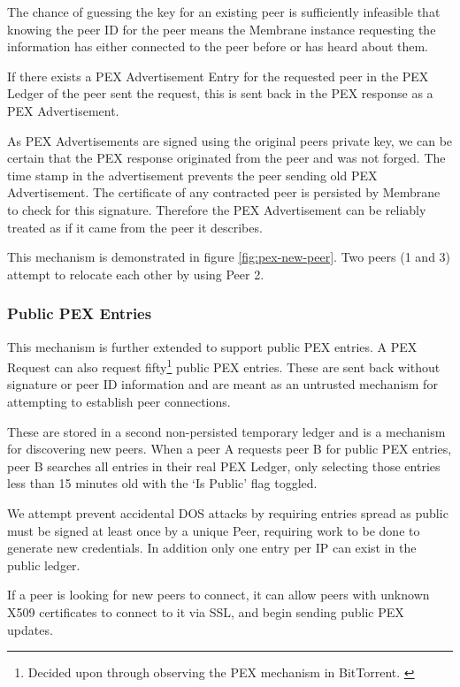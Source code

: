 \documentclass[11pt, a4paper, twoside]{report}
\begin{document}
The chance of guessing the key for an existing peer is sufficiently infeasible that knowing the peer ID for the peer means the Membrane instance requesting the information has either connected to the peer before or has heard about them.

If there exists a PEX Advertisement Entry for the requested peer in the PEX Ledger of the peer sent the request, this is sent back in the PEX response as a PEX Advertisement.

As PEX Advertisements are signed using the original peers private key, we can be certain that the PEX response originated from the peer and was not forged. \citep{li1993remark} The time stamp in the advertisement prevents the peer sending old PEX Advertisement. The certificate of any contracted peer is persisted by Membrane to check for this signature. Therefore the PEX Advertisement can be reliably treated as if it came from the peer it describes.

This mechanism is demonstrated in figure \ref{fig:pex-new-peer}. Two peers (1 and 3) attempt to relocate each other by using Peer 2.

\subsubsection{Public PEX Entries}

This mechanism is further extended to support public PEX entries. A PEX Request can also request fifty\footnote{Decided upon through observing the PEX mechanism in BitTorrent. \citep{vuze2010vuze}} public PEX entries. These are sent back without signature or peer ID information and are meant as an untrusted mechanism for attempting to establish peer connections.

These are stored in a second non-persisted temporary ledger and is a mechanism for discovering new peers. When a peer A requests peer B for public PEX entries, peer B searches all entries in their real PEX Ledger, only selecting those entries less than 15 minutes old with the `Is Public' flag toggled.

We attempt prevent accidental DOS attacks by requiring entries spread as public must be signed at least once by a unique Peer, requiring work to be done to generate new credentials. In addition only one entry per IP can exist in the public ledger.

If a peer is looking for new peers to connect, it can allow peers with unknown X509 certificates to connect to it via SSL, and begin sending public PEX updates.
\end{document}
